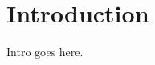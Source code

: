 \documentclass[Thesis.tex]{subfiles}
\begin{document}
\chapter{Introduction}

Intro goes here.
\end{document}
